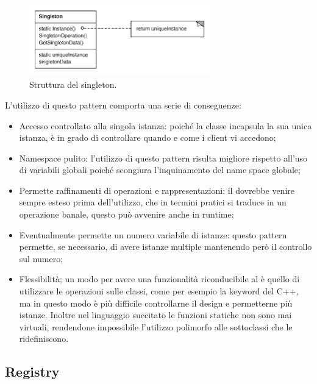 		\begin{figure}[h]
	\centering \includegraphics[width=0.7\textwidth]{patterns/Singleton.png}
	\caption{Struttura del singleton.}
	\label{fig:chainofresponsibility}
	\end{figure}
	
	L'utilizzo di questo pattern comporta una serie di conseguenze:
	\begin{itemize}
		\item Accesso controllato alla singola istanza: poiché la classe  incapsula la sua unica istanza, è in grado di controllare quando e come i client vi accedono;
		\item Namespace pulito: l'utilizzo di questo pattern risulta migliore rispetto all'uso di variabili globali poiché scongiura l'inquinamento del name space globale;
		\item Permette raffinamenti di operazioni e rappresentazioni: il  dovrebbe venire sempre esteso prima dell'utilizzo, che in termini pratici si traduce in un operazione banale, questo può avvenire anche in runtime;
		\item Eventualmente permette un numero variabile di istanze: questo pattern permette, se necessario, di avere istanze multiple mantenendo però il controllo sul numero;
		\item Flessibilità; un modo per avere una funzionalità riconducibile al  è quello di utilizzare le operazioni sulle classi, come per esempio la keyword  del C++, ma in questo modo è più difficile controllarne il design e permetterne più istanze. Inoltre nel linguaggio succitato le funzioni statiche non sono mai virtuali, rendendone impossibile l'utilizzo polimorfo alle sottoclassi che le ridefiniscono.
	\end{itemize}
	
	\subsection{Registry} %